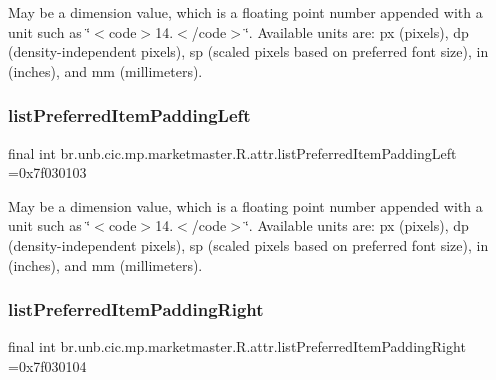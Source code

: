 May be a dimension value, which is a floating point number appended with a unit such as \char`\"{}$<$code$>$14.\+5sp$<$/code$>$\char`\"{}. Available units are\+: px (pixels), dp (density-\/independent pixels), sp (scaled pixels based on preferred font size), in (inches), and mm (millimeters). \mbox{\label{classbr_1_1unb_1_1cic_1_1mp_1_1marketmaster_1_1R_1_1attr_ab333c18bb4a1ae4a4db10af4891ec841}} 
\subsubsection{\texorpdfstring{list\+Preferred\+Item\+Padding\+Left}{listPreferredItemPaddingLeft}}
{\footnotesize\ttfamily final int br.\+unb.\+cic.\+mp.\+marketmaster.\+R.\+attr.\+list\+Preferred\+Item\+Padding\+Left =0x7f030103\hspace{0.3cm}{\ttfamily [static]}}

May be a dimension value, which is a floating point number appended with a unit such as \char`\"{}$<$code$>$14.\+5sp$<$/code$>$\char`\"{}. Available units are\+: px (pixels), dp (density-\/independent pixels), sp (scaled pixels based on preferred font size), in (inches), and mm (millimeters). \mbox{\label{classbr_1_1unb_1_1cic_1_1mp_1_1marketmaster_1_1R_1_1attr_aa698dfec575190043af2a7f45ff08be9}} 
\subsubsection{\texorpdfstring{list\+Preferred\+Item\+Padding\+Right}{listPreferredItemPaddingRight}}
{\footnotesize\ttfamily final int br.\+unb.\+cic.\+mp.\+marketmaster.\+R.\+attr.\+list\+Preferred\+Item\+Padding\+Right =0x7f030104\hspace{0.3cm}{\ttfamily [static]}}

